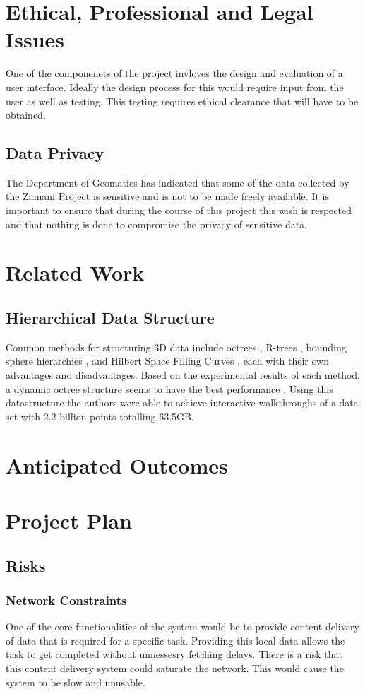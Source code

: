 \documentclass[12pt,a4paper]{article}
\begin{document}
\section{Ethical, Professional and Legal Issues}
One of the componenets of the project invloves the design and evaluation
of a user interface. Ideally the design process for this would require
input from the user as well as testing. This testing requires ethical clearance
that will have to be obtained.
\subsection{Data Privacy}
The Department of Geomatics has indicated that some of the data collected by the Zamani Project is sensitive and is not to be made freely available. It is important to ensure that during the course of this project this wish is respected and that nothing is done to compromise the privacy of sensitive data.



\section{Related Work}
\subsection{Hierarchical Data Structure}
Common methods for structuring 3D data include octrees \cite{interactivepointclouds}, R-trees \cite{rtree}, bounding sphere hierarchies \cite{qsplat}, and Hilbert Space Filling Curves \cite{hilbert}, each with their own advantages and disadvantages. Based on the experimental results of each method, a dynamic octree structure seems to have the best performance \cite{interactivepointclouds}. Using this datastructure the authors were able to achieve interactive walkthroughs of a data set with 2.2 billion points totalling 63.5GB.

\section{Anticipated Outcomes}

\section{Project Plan}
\subsection{Risks}
\subsubsection*{Network Constraints}
One of the core functionalities of the system would be to provide
content delivery of data that is required for a specific task. Providing
this local data allows the task to get completed without unnessesry
fetching delays. There is a risk that this content delivery system
could saturate the network. This would cause the system to be slow
and unusable.
\end{document}
